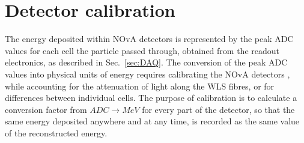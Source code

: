 
\section{Detector calibration}\label{sec:NOvACalibration}
The energy deposited within \gls{NOvA} detectors is represented by the peak \gls{ADC} values for each cell the particle passed through, obtained from the readout electronics, as described in Sec.~\ref{sec:DAQ}.
The conversion of the peak \gls{ADC} values into physical units of energy requires calibrating the \gls{NOvA} detectors \cite{PrabhjotNOvAThesis_CalibrationAndOscResults2019.pdf}, while accounting for the attenuation of light along the \gls{WLS} fibres, or for differences between individual cells. The purpose of calibration is to calculate a conversion factor from $\unit{ADC}\rightarrow\unit{MeV}$ for every part of the detector, so that the same energy deposited anywhere and at any time, is recorded as the same value of the reconstructed energy.


